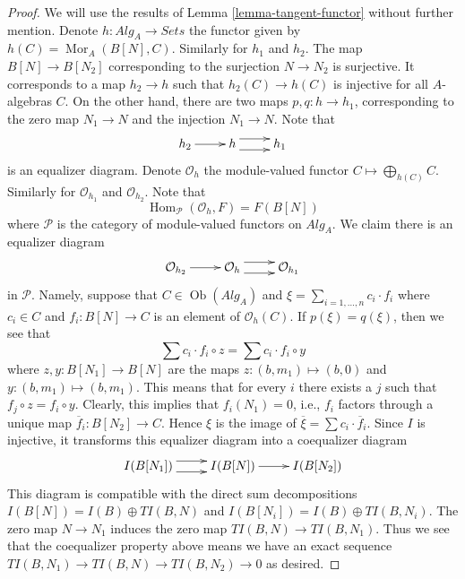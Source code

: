 \documentclass{stacks-project}
\theoremstyle{plain}
\theoremstyle{definition}
\theoremstyle{remark}
\numberwithin{equation}{subsection}
\def\Hom{\mathop{\mathrm{Hom}}\nolimits}
\def\Mor{\mathop{\mathrm{Mor}}\nolimits}
\def\Ob{\mathop{\mathrm{Ob}}\nolimits}
\begin{document}
\begin{proof}
We will use the results of
Lemma \ref{lemma-tangent-functor}
without further mention.
Denote $h : \textit{Alg}_A \to \textit{Sets}$ the functor given by
$h(C) = \Mor_A(B[N], C)$. Similarly for $h_1$ and $h_2$.
The map $B[N] \to B[N_2]$ corresponding to the surjection $N \to N_2$
is surjective. It corresponds to a map $h_2 \to h$ such that
$h_2(C) \to h(C)$ is injective for all $A$-algebras $C$. On the other
hand, there are two maps $p, q : h \to h_1$, corresponding to the
zero map $N_1 \to N$ and the injection $N_1 \to N$. Note that
$$
\xymatrix{
h_2 \ar[r] & h \ar@<1ex>[r] \ar@<-1ex>[r] & h_1
}
$$
is an equalizer diagram. Denote $\mathcal{O}_h$ the module-valued functor
$C \mapsto \bigoplus_{h(C)} C$. Similarly for $\mathcal{O}_{h_1}$ and
$\mathcal{O}_{h_2}$. Note that
$$
\Hom_\mathcal{P}(\mathcal{O}_h, F) = F(B[N])
$$
where $\mathcal{P}$ is the category of module-valued functors on
$\textit{Alg}_A$. We claim there is an equalizer diagram
$$
\xymatrix{
\mathcal{O}_{h_2} \ar[r] &
\mathcal{O}_h \ar@<1ex>[r] \ar@<-1ex>[r] &
\mathcal{O}_{h_1}
}
$$
in $\mathcal{P}$. Namely, suppose that $C \in \Ob(\textit{Alg}_A)$
and $\xi = \sum_{i = 1, \ldots, n} c_i \cdot f_i$ where $c_i \in C$ and
$f_i : B[N] \to C$ is an element of
$\mathcal{O}_h(C)$. If $p(\xi) = q(\xi)$, then
we see that
$$
\sum c_i \cdot f_i \circ z = \sum c_i \cdot f_i \circ y
$$
where $z, y : B[N_1] \to B[N]$ are the maps $z : (b, m_1) \mapsto (b, 0)$
and $y : (b, m_1) \mapsto (b, m_1)$. This means that for every $i$
there exists a $j$ such that $f_j \circ z = f_i \circ y$. Clearly, this
implies that $f_i(N_1) = 0$, i.e., $f_i$ factors through a unique map
$\overline{f}_i : B[N_2] \to C$. Hence $\xi$ is the image of
$\overline{\xi} = \sum c_i \cdot \overline{f}_i$.
Since $I$ is injective, it transforms this equalizer diagram
into a coequalizer diagram
$$
\xymatrix{
I(B[N_1]) \ar@<1ex>[r] \ar@<-1ex>[r] &
I(B[N]) \ar[r] &
I(B[N_2])
}
$$
This diagram is compatible with the direct sum decompositions
$I(B[N]) = I(B) \oplus TI(B, N)$ and $I(B[N_i]) = I(B) \oplus TI(B, N_i)$.
The zero map $N \to N_1$ induces the zero map $TI(B, N) \to TI(B, N_1)$.
Thus we see that the coequalizer property
above means we have an exact sequence
$TI(B, N_1) \to TI(B, N) \to TI(B, N_2) \to 0$
as desired.
\end{proof}
\end{document}
